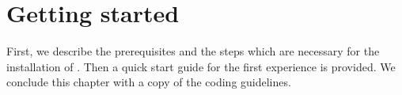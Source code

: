 \chapter{Getting started}

First, we describe the prerequisites and the steps which are necessary for the installation of \Dumux. Then a quick start guide for the first \Dumux experience is provided. We conclude this chapter with a copy of the \Dune coding guidelines. 





